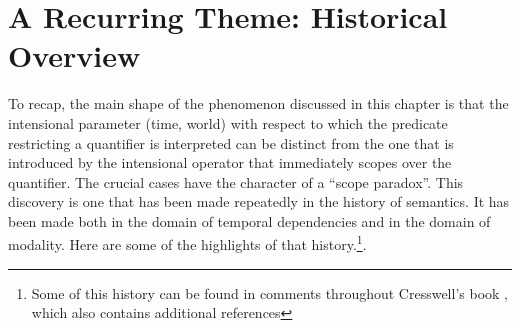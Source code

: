 \section{A Recurring Theme: Historical Overview}

To recap, the main shape of the phenomenon discussed in this chapter is that the intensional parameter (time, world) with respect to which the predicate restricting a quantifier is interpreted can be distinct from the one that is introduced by the intensional operator that immediately scopes over the quantifier. The crucial cases have the character of a ``scope paradox''. This discovery is one that has been made repeatedly in the history of semantics. It has been made both in the domain of temporal dependencies and in the domain of modality. Here are some of the highlights of that history.\footnote{Some of this history can be found in comments throughout Cresswell's book \citep{cresswell:entities}, which also contains additional references}.

